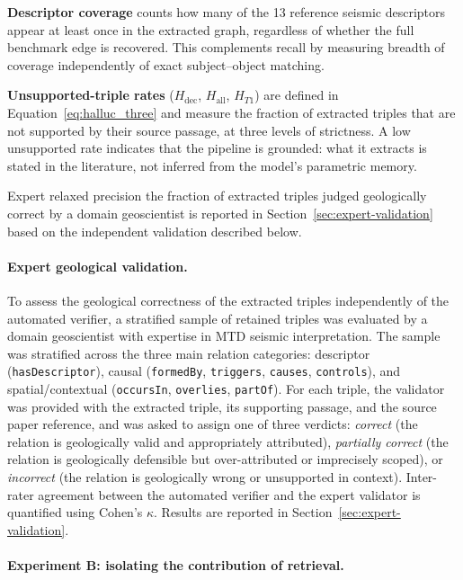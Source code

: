 \documentclass[10pt]{article}
\newcommand{\pred}[1]{\texttt{\small #1}}
\begin{document}
\textbf{Descriptor coverage} counts how many of the 13
reference seismic descriptors appear at least once in the
extracted graph, regardless of whether the full benchmark
edge is recovered.
This complements recall by measuring breadth of coverage
independently of exact subject--object matching.

\textbf{Unsupported-triple rates} ($H_{\text{dec}}$,
$H_{\text{all}}$, $H_{T1}$) are defined in
Equation~\ref{eq:halluc_three} and measure the fraction of
extracted triples that are not supported by their source
passage, at three levels of strictness.
A low unsupported rate indicates that the pipeline is
grounded: what it extracts is stated in the literature, not
inferred from the model's parametric memory.

Expert relaxed precision the fraction of extracted triples
judged geologically correct by a domain geoscientist is
reported in Section~\ref{sec:expert-validation} based on the
independent validation described below.

\paragraph{Expert geological validation.}

To assess the geological correctness of the extracted
triples independently of the automated verifier, a
stratified sample of retained triples was evaluated by a
domain geoscientist with expertise in MTD seismic
interpretation.
The sample was stratified across the three main relation
categories: descriptor (\pred{hasDescriptor}), causal
(\pred{formedBy}, \pred{triggers}, \pred{causes},
\pred{controls}), and spatial/contextual (\pred{occursIn},
\pred{overlies}, \pred{partOf}).
For each triple, the validator was provided with the
extracted triple, its supporting passage, and the source
paper reference, and was asked to assign one of three
verdicts: \emph{correct} (the relation is geologically
valid and appropriately attributed), \emph{partially
correct} (the relation is geologically defensible but
over-attributed or imprecisely scoped), or
\emph{incorrect} (the relation is geologically wrong or
unsupported in context).
Inter-rater agreement between the automated verifier and the
expert validator is quantified using Cohen's $\kappa$.
Results are reported in Section~\ref{sec:expert-validation}.

\paragraph{Experiment B: isolating the contribution of
retrieval.}
\end{document}
